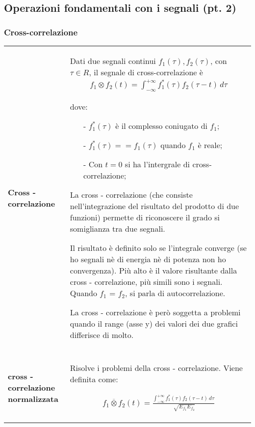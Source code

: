 \documentclass[a4paper, 10pt]{report}
\begin{document}
\subsection*{Operazioni fondamentali con i segnali (pt. 2)}

\subsubsection*{Cross-correlazione} 

\begin{longtable}{| p{} | p{} |}
\textbf{Cross - correlazione} & Dati due segnali continui $f_1(\tau), f_2(\tau)$, con $\tau \in R$, il segnale di cross-correlazione è
\begin{align*}
f_1 \otimes f_2 (t) = \int_{-\infty}^{+\infty} f_1^*(\tau)f_2(\tau - t)\, d \tau
\end{align*}

\noindent dove:
\begin{itemize}
\item[-] $f_1^*(\tau)$ è il complesso coniugato di $f_1$;
\item[-] $f_1^*(\tau) == f_1(\tau)$ quando $f_1$ è reale;
\item[-] Con $t = 0$ si ha l'intergrale di cross-correlazione;
\end{itemize}

\noindent La cross - correlazione (che consiste nell'integrazione del risultato del prodotto di due funzioni) permette di riconoscere il grado si somiglianza tra due segnali. 

\noindent Il risultato è definito solo se l’integrale converge (se ho
segnali nè di energia nè di potenza non ho
convergenza). Più alto è il valore risultante dalla cross - correlazione, più simili sono i segnali. Quando $f_1$ = $f_2$, si parla di autocorrelazione.

\noindent La cross - correlazione è però soggetta a problemi quando il range (asse y) dei valori dei due grafici differisce di molto.\\\\

\textbf{cross - correlazione normalizzata} & Risolve i problemi della cross - correlazione. Viene definita come:

\begin{align*}
f_1 \overline{\otimes} f_2 (t) = \frac{\int_{-\infty}^{+\infty} f_1^*(\tau)f_2(\tau - t)\, d \tau}{\sqrt[]{E_{f_1}E_{f_2}}}
\end{align*}


\end{longtable}
\end{document}
